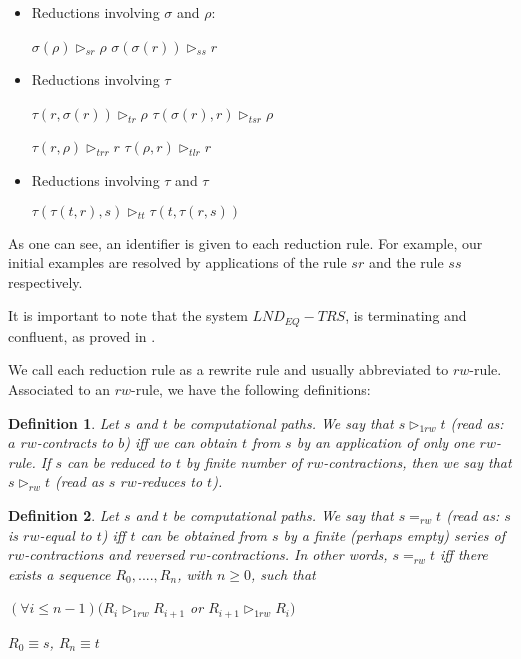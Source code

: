 \documentclass[12pt, a4paper,  oneside, headinclude,footinclude, BCOR5mm]{scrartcl}
\newtheorem{definition}{Definition}[section]
\begin{document}
\begin{itemize}

\item Reductions involving $\sigma$ and $\rho$:

$\sigma(\rho) \rhd_{sr} \rho$ \quad $\sigma(\sigma(r)) \rhd_{ss} r$

\item Reductions involving $\tau$

$\tau(r,\sigma(r)) \rhd_{tr} \rho$ \quad $\tau(\sigma(r),r) \rhd_{tsr} \rho$

$\tau(r,\rho) \rhd_{trr} r$ \quad $\tau(\rho,r) \rhd_{tlr} r$

\item Reductions involving $\tau$ and $\tau$

$\tau(\tau(t,r),s) \rhd_{tt} \tau(t, \tau(r,s))$

\end{itemize}

As one can see, an identifier is given to each reduction rule. For example, our initial examples are resolved by applications of the rule $sr$ and the rule $ss$ respectively.

It is important to note that the system $LND_{EQ}-TRS$, is terminating and confluent, as proved in \cite{Anjo1,Ruy2,Ruy3,RuyAnjolinaLivro}.

We call each reduction rule as a rewrite rule and usually abbreviated to $rw$-rule. Associated to an $rw$-rule, we have the following definitions:

\begin{definition}
Let $s$ and $t$ be computational paths. We say that $s \rhd_{1rw} t$ (read as: $a$ $rw$-contracts to $b$) iff we can obtain $t$ from $s$ by an application of only one $rw$-rule. If $s$ can be reduced to $t$ by finite number of $rw$-contractions, then we say that $s \rhd_{rw} t$ (read as $s$ $rw$-reduces to $t$).

\end{definition}

\begin{definition}
Let $s$ and $t$ be computational paths. We say that $s =_{rw} t$ (read as: $s$ is $rw$-equal to $t$) iff $t$ can be obtained from $s$ by a finite (perhaps empty) series of $rw$-contractions and reversed $rw$-contractions. In other words, $s =_{rw} t$ iff there exists a sequence $R_{0},....,R_{n}$, with $n \geq 0$, such that

\centering $(\forall i \leq n - 1) (R_{i}\rhd_{1rw} R_{i+1}$ or $R_{i+1} \rhd_{1rw} R_{i})$

\centering  $R_{0} \equiv s$, \quad $R_{n} \equiv t$
\end{definition}
\end{document}
